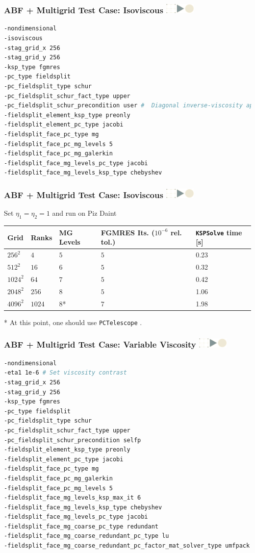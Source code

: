 \documentclass{beamer}
\newcommand\frametitlelogo[1]{\frametitle{#1\hspace{0pt plus 1 filll} \includegraphics[width=42pt]{logo_slides}}}
\begin{document}
\begin{frame}[fragile]
\frametitlelogo{ABF + Multigrid Test Case: Isoviscous}
\begin{lstlisting}[language=bash,basicstyle=\scriptsize\ttfamily]
-nondimensional
-isoviscous
-stag_grid_x 256
-stag_grid_y 256
-ksp_type fgmres
-pc_type fieldsplit
-pc_fieldsplit_type schur
-pc_fieldsplit_schur_fact_type upper
-pc_fieldsplit_schur_precondition user #  Diagonal inverse-viscosity approximation
-fieldsplit_element_ksp_type preonly
-fieldsplit_element_pc_type jacobi
-fieldsplit_face_pc_type mg
-fieldsplit_face_pc_mg_levels 5
-fieldsplit_face_pc_mg_galerkin
-fieldsplit_face_mg_levels_pc_type jacobi
-fieldsplit_face_mg_levels_ksp_type chebyshev
\end{lstlisting}
\end{frame}

\begin{frame}[fragile]
\frametitlelogo{ABF + Multigrid Test Case: Isoviscous}
  Set $\eta_1 = \eta_2 = 1$ and run on Piz Daint
\begin{table}[]
\begin{tabular}{lllll}
  Grid &  Ranks & MG Levels & FGMRES Its. ($10^{-6}$ rel. tol.) &  \texttt{KSPSolve} time  [s]  \\
\hline
  $256^2$  & $4$    & $5$  & $5$ & 0.23  \\
  $512^2$  & $16$   & $6$  & $5$ & 0.32  \\
  $1024^2$ & $64$   & $7$  & $5$ & 0.42  \\
  $2048^2$ & $256$  & $8$  & $5$ & 1.06  \\
  $4096^2$ & $1024$ & $8$* & $7$ & 1.98\\
\end{tabular}
\end{table}

  * At this point, one should use \texttt{PCTelescope} .

\end{frame}

\begin{frame}[fragile]
\frametitlelogo{ABF + Multigrid Test Case: Variable Viscosity}
\begin{lstlisting}[language=bash,basicstyle=\scriptsize\ttfamily]
-nondimensional
-eta1 1e-6 # Set viscosity contrast
-stag_grid_x 256
-stag_grid_y 256
-ksp_type fgmres
-pc_type fieldsplit
-pc_fieldsplit_type schur
-pc_fieldsplit_schur_fact_type upper
-pc_fieldsplit_schur_precondition selfp
-fieldsplit_element_ksp_type preonly
-fieldsplit_element_pc_type jacobi
-fieldsplit_face_pc_type mg
-fieldsplit_face_pc_mg_galerkin
-fieldsplit_face_pc_mg_levels 5
-fieldsplit_face_mg_levels_ksp_max_it 6
-fieldsplit_face_mg_levels_ksp_type chebyshev
-fieldsplit_face_mg_levels_pc_type jacobi
-fieldsplit_face_mg_coarse_pc_type redundant
-fieldsplit_face_mg_coarse_redundant_pc_type lu
-fieldsplit_face_mg_coarse_redundant_pc_factor_mat_solver_type umfpack
\end{lstlisting}
\end{frame}
\end{document}
